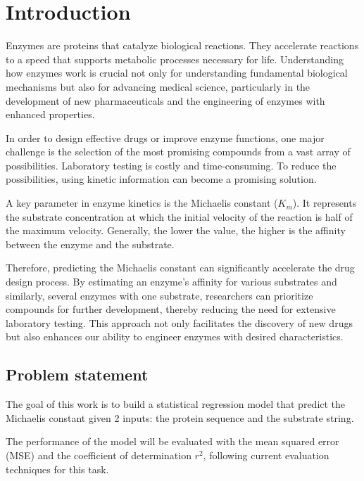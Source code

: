 
\chapter{Introduction}
\label{chap:1}

Enzymes are proteins that catalyze biological reactions. They accelerate reactions 
to a speed that supports metabolic processes necessary for life. 
Understanding how enzymes work is crucial not only for understanding fundamental 
biological mechanisms but also for advancing medical science, 
particularly in the development of new pharmaceuticals and the engineering 
of enzymes with enhanced properties.

In order to design effective drugs or improve enzyme functions, 
one major challenge is the selection of the most promising compounds 
from a vast array of possibilities. 
Laboratory testing is costly and time-consuming. To reduce the possibilities,
using kinetic information can become a promising solution.

A key parameter in enzyme kinetics is the Michaelis constant ($K_m$). It represents
the substrate concentration at which the initial velocity of the reaction is half of
the maximum velocity. Generally, the lower the value, the higher is the affinity 
between the enzyme and the substrate.

Therefore, predicting the Michaelis constant can significantly accelerate the drug design process. 
By estimating an enzyme's affinity for various substrates and similarly, several enzymes
with one substrate, researchers can prioritize compounds for further development, 
thereby reducing the need for extensive laboratory testing. 
This approach not only facilitates the discovery of new drugs but also enhances 
our ability to engineer enzymes with desired characteristics.

\section{Problem statement}

The goal of this work is to build a statistical regression model that predict the 
Michaelis constant given 2 inputs: the protein sequence and the substrate string. 

The performance of the model will be evaluated with the mean squared error (MSE) and 
the coefficient of determination $r^2$, following current evaluation techniques for this task.

